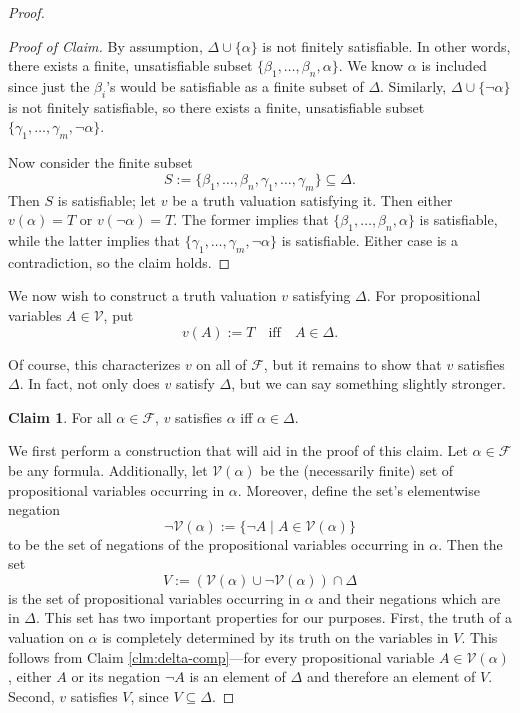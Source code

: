 \documentclass[12pt]{article}
\theoremstyle{definition}
\newtheorem{claim}[theorem]{Claim}
\newcommand{\isp}[1]{\quad\text{#1}\quad}
\newcommand{\<}{\langle}
\renewcommand{\>}{\rangle}
\newcommand{\seq}{\subseteq}
\newcommand{\FF}{\mathcal{F}}
\newcommand{\VV}{\mathcal{V}}
\begin{document}
\begin{proof}
\begin{proof}[Proof of Claim]
        By assumption, $\Delta \cup \{\alpha\}$ is not finitely satisfiable.
        In other words, there exists a finite, unsatisfiable subset $\{\beta_1, \dots, \beta_n, \alpha\}$.
        We know $\alpha$ is included since just the $\beta_i$'s would be satisfiable as a finite subset of $\Delta$.        
        Similarly, $\Delta \cup \{\lnot\alpha\}$ is not finitely satisfiable, so there exists a finite, unsatisfiable subset $\{\gamma_1, \dots, \gamma_m, \lnot\alpha\}$.

        Now consider the finite subset
        \[
            S := \{\beta_1, \dots, \beta_n, \gamma_1, \dots, \gamma_m\} \seq \Delta.
        \]
        Then $S$ is satisfiable; let $v$ be a truth valuation satisfying it.
        Then either $v(\alpha) = T$ or $v(\lnot\alpha) = T$.
        The former implies that $\{\beta_1, \dots, \beta_n, \alpha\}$ is satisfiable, while the latter implies that $\{\gamma_1, \dots, \gamma_m, \lnot\alpha\}$ is satisfiable.
        Either case is a contradiction, so the claim holds.
    \end{proof}

    We now wish to construct a truth valuation $v$ satisfying $\Delta$.
    For propositional variables $A \in \VV$, put
    \[
        v(A) := T \isp{iff} A \in \Delta.
    \]

    Of course, this characterizes $v$ on all of $\FF$, but it remains to show that $v$ satisfies $\Delta$.
    In fact, not only does $v$ satisfy $\Delta$, but we can say something slightly stronger.

    \begin{claim}\label{clm:v-sat}
        For all $\alpha \in \FF$, $v$ satisfies $\alpha$ iff $\alpha \in \Delta$.
    \end{claim}

    We first perform a construction that will aid in the proof of this claim.
    Let $\alpha \in \FF$ be any formula.
    Additionally, let $\VV(\alpha)$ be the (necessarily finite) set of propositional variables occurring in $\alpha$.
    Moreover, define the set's elementwise negation
    \[
        \lnot\VV(\alpha) := \{\lnot A \mid A \in \VV(\alpha)\}
    \]
    to be the set of negations of the propositional variables occurring in $\alpha$.
    Then the set
    \[
        V := (\VV(\alpha) \cup \lnot\VV(\alpha)) \cap \Delta
    \]
    is the set of propositional variables occurring in $\alpha$ and their negations which are in $\Delta$.
    This set has two important properties for our purposes.
    First, the truth of a valuation on $\alpha$ is completely determined by its truth on the variables in $V$.
    This follows from Claim \ref{clm:delta-comp}---for every propositional variable $A \in \VV(\alpha)$, either $A$ or its negation $\lnot A$ is an element of $\Delta$ and therefore an element of $V$.
    Second, $v$ satisfies $V$, since $V \seq \Delta$.


\end{proof}
\end{document}
